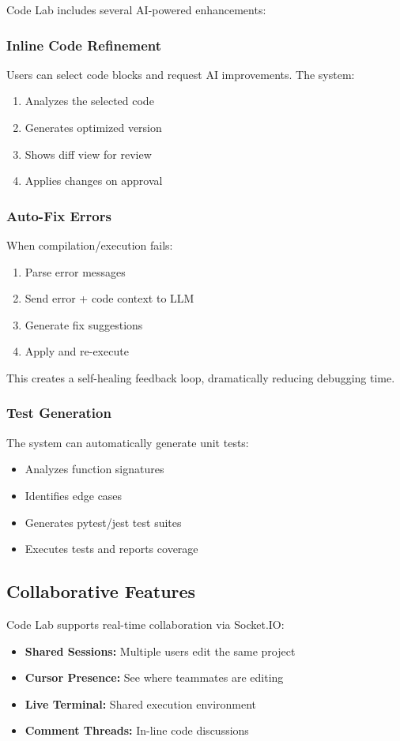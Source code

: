 \documentclass[conference]{IEEEtran}
\begin{document}
Code Lab includes several AI-powered enhancements:

\subsubsection{Inline Code Refinement}
Users can select code blocks and request AI improvements. The system:
\begin{enumerate}
    \item Analyzes the selected code
    \item Generates optimized version
    \item Shows diff view for review
    \item Applies changes on approval
\end{enumerate}

\subsubsection{Auto-Fix Errors}
When compilation/execution fails:
\begin{enumerate}
    \item Parse error messages
    \item Send error + code context to LLM
    \item Generate fix suggestions
    \item Apply and re-execute
\end{enumerate}

This creates a self-healing feedback loop, dramatically reducing debugging time.

\subsubsection{Test Generation}
The system can automatically generate unit tests:
\begin{itemize}
    \item Analyzes function signatures
    \item Identifies edge cases
    \item Generates pytest/jest test suites
    \item Executes tests and reports coverage
\end{itemize}

\subsection{Collaborative Features}

Code Lab supports real-time collaboration via Socket.IO:
\begin{itemize}
    \item \textbf{Shared Sessions:} Multiple users edit the same project
    \item \textbf{Cursor Presence:} See where teammates are editing
    \item \textbf{Live Terminal:} Shared execution environment
    \item \textbf{Comment Threads:} In-line code discussions
\end{itemize}
\end{document}
